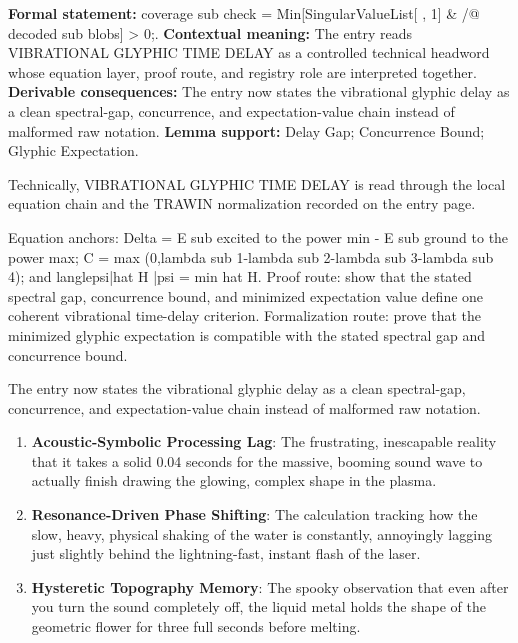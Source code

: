 \begingroup\footnotesize\setlength{\emergencystretch}{3em}\sloppy
\textbf{Formal statement:} coverage sub check = Min[SingularValueList[ , 1] \& /@ decoded sub blobs] > 0;. \textbf{Contextual meaning:} The entry reads VIBRATIONAL GLYPHIC TIME DELAY as a controlled technical headword whose equation layer, proof route, and registry role are interpreted together. \textbf{Derivable consequences:} The entry now states the vibrational glyphic delay as a clean spectral-gap, concurrence, and expectation-value chain instead of malformed raw notation. \textbf{Lemma support:} Delay Gap; Concurrence Bound; Glyphic Expectation.\par
\endgroup

Technically, VIBRATIONAL GLYPHIC TIME DELAY is read through the local equation chain and the TRAWIN normalization recorded on the entry page.

Equation anchors: Delta = E sub excited to the power min - E sub ground to the power max; C = max (0,lambda sub 1-lambda sub 2-lambda sub 3-lambda sub 4); and langlepsi|hat H |psi = min hat H. Proof route: show that the stated spectral gap, concurrence bound, and minimized expectation value define one coherent vibrational time-delay criterion. Formalization route: prove that the minimized glyphic expectation is compatible with the stated spectral gap and concurrence bound.

The entry now states the vibrational glyphic delay as a clean spectral-gap, concurrence, and expectation-value chain instead of malformed raw notation.
\endgroup

\begin{enumerate}[leftmargin=1.6em,itemsep=6pt,topsep=4pt]
\item \textbf{Acoustic-Symbolic Processing Lag}: The frustrating, inescapable reality that it takes a solid 0.04 seconds for the massive, booming sound wave to actually finish drawing the glowing, complex shape in the plasma.
\item \textbf{Resonance-Driven Phase Shifting}: The calculation tracking how the slow, heavy, physical shaking of the water is constantly, annoyingly lagging just slightly behind the lightning-fast, instant flash of the laser.
\item \textbf{Hysteretic Topography Memory}: The spooky observation that even after you turn the sound completely off, the liquid metal holds the shape of the geometric flower for three full seconds before melting.
\end{enumerate}

